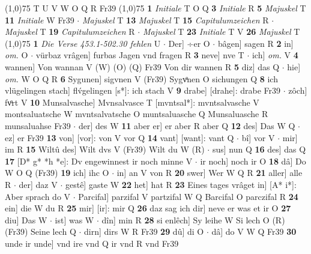 \documentclass[8pt,a4paper,notitlepage]{article}
\begin{document}
\begin{table}[ht]
\begin{minipage}[t]{0.5\linewidth}
\scriptsize
\line(1,0){75} \newline
T U V W O Q R Fr39 \newline
\line(1,0){75} \newline
\textbf{1} \textit{Initiale} T O Q  \textbf{3} \textit{Initiale} R  \textbf{5} \textit{Majuskel} T  \textbf{11} \textit{Initiale} W Fr39   $\cdot$ \textit{Majuskel} T  \textbf{13} \textit{Majuskel} T  \textbf{15} \textit{Capitulumzeichen} R   $\cdot$ \textit{Majuskel} T  \textbf{19} \textit{Capitulumzeichen} R   $\cdot$ \textit{Majuskel} T  \textbf{23} \textit{Initiale} T V  \textbf{26} \textit{Majuskel} T  \newline
\line(1,0){75} \newline
\textbf{1} \textit{Die Verse 453.1-502.30 fehlen} U   $\cdot$ Der] ÷er O  $\cdot$ bâgen] sagen R \textbf{2} in] \textit{om.} O  $\cdot$ vürbaz vrâgen] furbas Jagen vnd fragen R \textbf{3} neve] nve T  $\cdot$ ich] \textit{om.} V \textbf{4} wannen] Von wannan V (W) (O) (Q) Fr39 Von dir wannen R \textbf{5} diz] das Q  $\cdot$ hie] \textit{om.} W O Q R \textbf{6} Sygunen] sigvnen V (Fr39) Sygvͦnen O sichungen Q \textbf{8} ich vlügelingen stach] flv́gelingen [s*]: ich stach V \textbf{9} drabe] [drahe]: drabe Fr39  $\cdot$ zôch] fvͦrt V \textbf{10} Munsalvasche] Mvnsalvasce T [mvntsal*]: mvntsalvasche V montsaluatsche W mvntsalvatsche O muntsaluasche Q Munsaluasche R munsaluahse Fr39  $\cdot$ der] des W \textbf{11} aber er] er aber R aber Q \textbf{12} des] Das W Q  $\cdot$ ez] er Fr39 \textbf{13} von] [vor]: von V vor Q \textbf{14} vant] [want]: vant Q  $\cdot$ bî] vor V  $\cdot$ mir] im R \textbf{15} Wiltû des] Wilt dvs V (Fr39) Wilt du W (R)  $\cdot$ sus] nun Q \textbf{16} des] das Q \textbf{17} [D* g* *h *e]: Dv engewinnest ir noch minne V  $\cdot$ ir noch] noch ir O \textbf{18} dâ] Do W O Q (Fr39) \textbf{19} ich] ihc O  $\cdot$ in] an V von R \textbf{20} swer] Wer W Q R \textbf{21} aller] alle R  $\cdot$ der] daz V  $\cdot$ gestê] gaste W \textbf{22} het] hat R \textbf{23} Eines tages vrâget in] [A* i*]: Aber sprach do V  $\cdot$ Parcifal] parzifal V partzifal W Q Barcifal O parczifal R \textbf{24} ein] die W du R \textbf{25} mir] [ir]: mir Q \textbf{26} daz sag ich dir] neve er was et ir O \textbf{27} diu] Das W  $\cdot$ ist] was W  $\cdot$ dîn] min R \textbf{28} si enlêch] Sy leihe W Si lech O (R) (Fr39) Seine lech Q  $\cdot$ dirn] dirs W R Fr39 \textbf{29} dû] di O  $\cdot$ dâ] do V W Q Fr39 \textbf{30} unde ir unde] vnd ire vnd Q ir vnd R vnd Fr39 \newline
\end{minipage}
\end{table}
\end{document}

